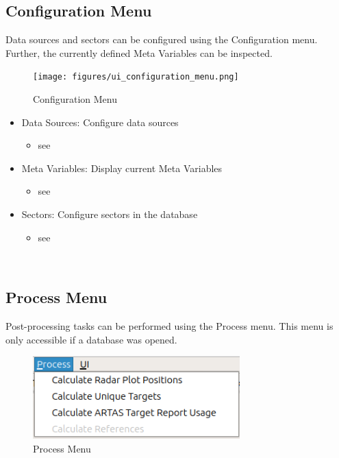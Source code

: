 \subsection{Configuration Menu}
\label{sec:ui_overview_config_menu}

Data sources and sectors can be configured using the Configuration menu. Further, the currently defined Meta Variables can be inspected.

\begin{figure}[H]
  \center
    \texttt{[image: figures/ui\_configuration\_menu.png]}
  \caption{Configuration Menu}
\end{figure}

\begin{itemize}
 \item Data Sources: Configure data sources
  \begin{itemize}
 \item see 
 \end{itemize}
 \item Meta Variables: Display current Meta Variables
  \begin{itemize}
 \item see 
 \end{itemize}
 \item Sectors: Configure sectors in the database
  \begin{itemize}
 \item see 
 \end{itemize}
\end{itemize}
\  \\

\subsection{Process Menu}
\label{sec:ui_overview_process_menu}

Post-processing tasks can be performed using the Process menu. This menu is only accessible if a database was opened.

\begin{figure}[H]
  \center
    \includegraphics[width=8cm,frame]{figures/ui_process_menu.png}
  \caption{Process Menu}
\end{figure}

